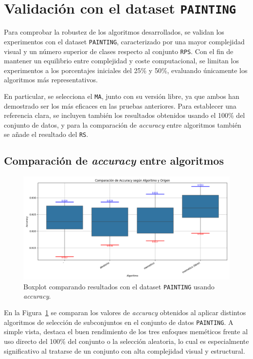 \section{Validación con el dataset \texttt{PAINTING}}\label{sec:validacion-con-painting}
Para comprobar la robustez de los algoritmos desarrollados, se validan los experimentos con el dataset \texttt{PAINTING},
caracterizado por una mayor complejidad visual y un número superior de clases respecto al conjunto \texttt{RPS}.
Con el fin de mantener un equilibrio entre complejidad y coste computacional, se limitan los experimentos a los porcentajes iniciales del 25\% y 50\%,
evaluando únicamente los algoritmos más representativos.

En particular, se selecciona el \texttt{MA}, junto con su versión libre, ya que ambos han demostrado ser los más eficaces en las pruebas anteriores.
Para establecer una referencia clara, se incluyen también los resultados obtenidos usando el 100\% del conjunto de datos, y para la comparación de
\textit{accuracy} entre algoritmos también se añade el resultado del \texttt{RS}.

\subsection{Comparación de \textit{accuracy} entre algoritmos}
\begin{figure}[htp]
    \centering
    \includegraphics[width=1\textwidth]{imagenes/evaluaciones/painting/comparacion-por-algoritmo}
    \caption{Boxplot comparando resultados con el dataset \texttt{PAINTING} usando \textit{accuracy}.}
    \label{fig:comparacion-por-algoritmo}
\end{figure}

En la Figura~\ref{fig:comparacion-por-algoritmo} se comparan los valores de \textit{accuracy} obtenidos al aplicar distintos
algoritmos de selección de subconjuntos en el conjunto de datos \texttt{PAINTING}.
A simple vista, destaca el buen rendimiento de los tres enfoques meméticos frente al uso directo del 100\% del conjunto o la selección aleatoria,
lo cual es especialmente significativo al tratarse de un conjunto con alta complejidad visual y estructural.

